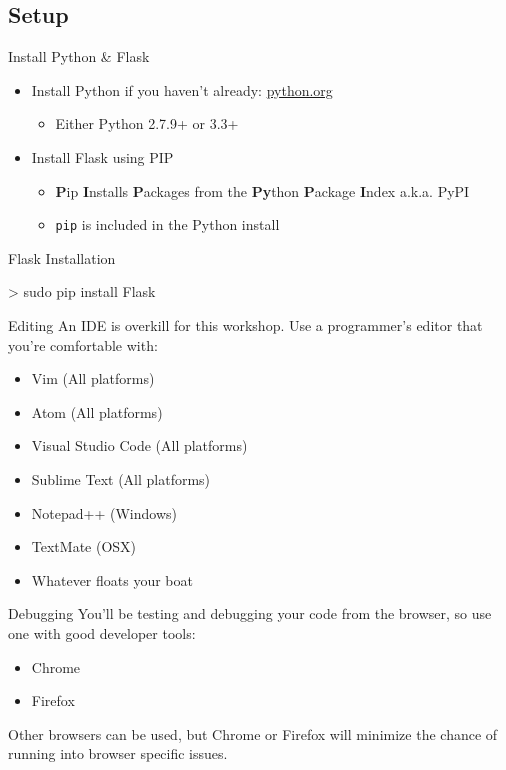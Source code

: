 \documentclass{beamer}
\begin{document}
\subsection{Setup}
	\begin{frame}[t]{Install Python \& Flask}
		\begin{itemize}
			\item{
				Install Python if you haven't already: \url{python.org}
				\begin{itemize}
					\item{Either Python 2.7.9+ or 3.3+}
				\end{itemize}
			}
			\item{
				Install Flask using PIP
				\begin{itemize}
					\item{\textbf{P}ip \textbf{I}nstalls \textbf{P}ackages from
						the \textbf{Py}thon \textbf{P}ackage \textbf{I}ndex a.k.a. PyPI}
					\item{\texttt{pip} is included in the Python install}
				\end{itemize}
			}
		\end{itemize}
		\begin{block}{Flask Installation}
		\begin{semiverbatim}
			> sudo pip install Flask
		\end{semiverbatim}
		\end{block}
	\end{frame}


	\begin{frame}[t]{Editing}
		An IDE is overkill for this workshop. Use a programmer's editor that
		you're comfortable with:
		\begin{itemize}
			\item{Vim (All platforms)}
			\item{Atom (All platforms)}
			\item{Visual Studio Code (All platforms)}
			\item{Sublime Text (All platforms)}
			\item{Notepad++ (Windows)}
			\item{TextMate (OSX)}
			\item{Whatever floats your boat}
		\end{itemize}
	\end{frame}


	\begin{frame}[t]{Debugging}
		You'll be testing and debugging your code from the browser, so use one
		with good developer tools:
		\begin{itemize}
			\item{Chrome}
			\item{Firefox}
		\end{itemize}

		Other browsers can be used, but Chrome or Firefox will minimize the
		chance of running into browser specific issues.
	\end{frame}
\end{document}
